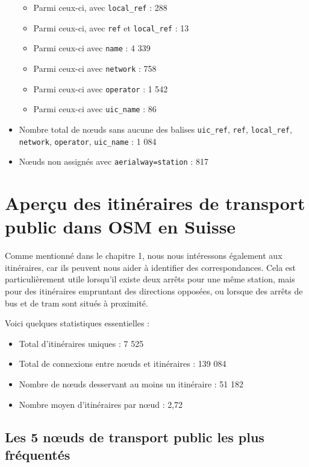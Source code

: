 \begin{itemize}
\begin{itemize}
        \item Parmi ceux-ci, avec \texttt{local\_ref} : 288
        \item Parmi ceux-ci, avec \texttt{ref} et \texttt{local\_ref} : 13
        \item Parmi ceux-ci avec \texttt{name} : 4 339
        \item Parmi ceux-ci avec \texttt{network} : 758
        \item Parmi ceux-ci avec \texttt{operator} : 1 542
        \item Parmi ceux-ci avec \texttt{uic\_name} : 86
    \end{itemize}
    \item Nombre total de nœuds sans aucune des balises \texttt{uic\_ref}, \texttt{ref}, \texttt{local\_ref}, \texttt{network}, \texttt{operator}, \texttt{uic\_name} : 1 084
    \item Nœuds non assignés avec \texttt{aerialway=station} : 817
\end{itemize}

\section{Aperçu des itinéraires de transport public dans OSM en Suisse}

Comme mentionné dans le chapitre 1, nous nous intéressons également aux itinéraires, car ils peuvent nous aider à identifier des correspondances. Cela est particulièrement utile lorsqu'il existe deux arrêts pour une même station, mais pour des itinéraires empruntant des directions opposées, ou lorsque des arrêts de bus et de tram sont situés à proximité.

Voici quelques statistiques essentielles :

\begin{itemize}
    \item Total d'itinéraires uniques : 7 525  
    \item Total de connexions entre nœuds et itinéraires : 139 084  
    \item Nombre de nœuds desservant au moins un itinéraire : 51 182  
    \item Nombre moyen d'itinéraires par nœud : 2,72  
\end{itemize}

\subsection{Les 5 nœuds de transport public les plus fréquentés}

